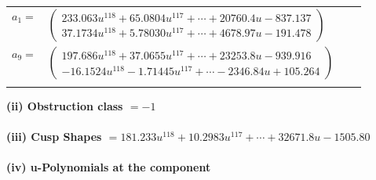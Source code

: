 \documentclass[1p]{elsarticle_modified}
\theoremstyle{definition}
\begin{document}
\begin{tabular}{m{7pt} m{180pt} m{7pt} m{180pt} }
\flushright $a_{1}=$&$\begin{pmatrix}233.063 u^{118}+65.0804 u^{117}+\cdots+20760.4 u-837.137\\37.1734 u^{118}+5.78030 u^{117}+\cdots+4678.97 u-191.478\end{pmatrix}$ \\
\flushright $a_{9}=$&$\begin{pmatrix}197.686 u^{118}+37.0655 u^{117}+\cdots+23253.8 u-939.916\\-16.1524 u^{118}-1.71445 u^{117}+\cdots-2346.84 u+105.264\end{pmatrix}$\\&\end{tabular}
\flushleft \textbf{(ii) Obstruction class $= -1$}\\~\\
\flushleft \textbf{(iii) Cusp Shapes $= 181.233 u^{118}+10.2983 u^{117}+\cdots+32671.8 u-1505.80$}\\~\\
\newpage\renewcommand{\arraystretch}{1}
\flushleft \textbf{(iv) u-Polynomials at the component}\newline \\
\end{document}

